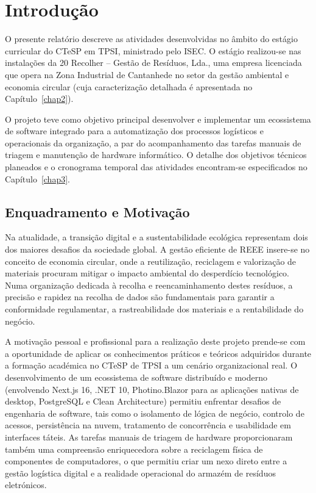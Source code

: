 \chapter{Introdução}\label{chap1}
\acresetall

O presente relatório descreve as atividades desenvolvidas no âmbito do estágio curricular do \ac{CTeSP} em \ac{TPSI}, ministrado pelo \ac{ISEC}. O estágio realizou-se nas instalações da 20 Recolher -- Gestão de Resíduos, Lda., uma empresa licenciada que opera na Zona Industrial de Cantanhede no setor da gestão ambiental e economia circular (cuja caracterização detalhada é apresentada no Capítulo~\ref{chap2}).

O projeto teve como objetivo principal desenvolver e implementar um ecossistema de software integrado para a automatização dos processos logísticos e operacionais da organização, a par do acompanhamento das tarefas manuais de triagem e manutenção de hardware informático. O detalhe dos objetivos técnicos planeados e o cronograma temporal das atividades encontram-se especificados no Capítulo~\ref{chap3}.

\section{Enquadramento e Motivação}

Na atualidade, a transição digital e a sustentabilidade ecológica representam dois dos maiores desafios da sociedade global. A gestão eficiente de \ac{REEE} insere-se no conceito de economia circular, onde a reutilização, reciclagem e valorização de materiais procuram mitigar o impacto ambiental do desperdício tecnológico. Numa organização dedicada à recolha e reencaminhamento destes resíduos, a precisão e rapidez na recolha de dados são fundamentais para garantir a conformidade regulamentar, a rastreabilidade dos materiais e a rentabilidade do negócio.

A motivação pessoal e profissional para a realização deste projeto prende-se com a oportunidade de aplicar os conhecimentos práticos e teóricos adquiridos durante a formação académica no \ac{CTeSP} de \ac{TPSI} a um cenário organizacional real. O desenvolvimento de um ecossistema de software distribuído e moderno (envolvendo Next.js 16, .NET 10, Photino.Blazor para as aplicações nativas de desktop, PostgreSQL e Clean Architecture) permitiu enfrentar desafios de engenharia de software, tais como o isolamento de lógica de negócio, controlo de acessos, persistência na nuvem, tratamento de concorrência e usabilidade em interfaces táteis. As tarefas manuais de triagem de hardware proporcionaram também uma compreensão enriquecedora sobre a reciclagem física de componentes de computadores, o que permitiu criar um nexo direto entre a gestão logística digital e a realidade operacional do armazém de resíduos eletrónicos.


